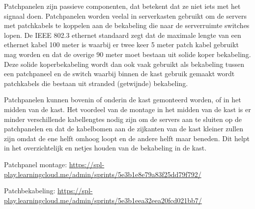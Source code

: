 Patchpanelen zijn passieve componenten, dat betekent dat ze niet iets met het signaal doen. Patchpanelen worden veelal in serverkasten gebruikt om de servers met patchkabels te koppelen aan de bekabeling die naar de serverruimte switches lopen. De IEEE 802.3 ethernet standaard zegt dat de maximale lengte van een ethernet kabel 100 meter is waarbij er twee keer 5 meter patch kabel gebruikt mag worden en dat de overige 90 meter moet bestaan uit solide koper bekabeling. Deze solide koperbekabeling wordt dan ook vaak gebruikt als bekabeling tussen een patchpaneel en de switch waarbij binnen de kast gebruik gemaakt wordt patchkabels die bestaan uit stranded (getwijnde) bekabeling.

Patchpanelen kunnen bovenin of onderin de kast gemonteerd worden, of in het midden van de kast. Het voordeel van de montage in het midden van de kast is er minder verschillende kabellengtes nodig zijn om de servers aan te sluiten op de patchpanelen en dat de kabelbomen aan de zijkanten van de kast kleiner zullen zijn omdat de ene helft omhoog loopt en de andere helft maar beneden. Dit helpt in het overzichtelijk en netjes houden van de bekabeling in de kast.

Patchpanel montage:
\url{https://spl-play.learningcloud.me/admin/sprints/5e3b1e8e79a83f25dd79f792/}

Patchbekabeling:
\url{https://spl-play.learningcloud.me/admin/sprints/5e3b1eea32eea20fcd021bb7/}


